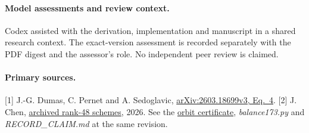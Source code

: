 \documentclass[11pt]{article}
\begin{document}
\paragraph{Model assessments and review context.}
Codex assisted with the derivation, implementation and manuscript in a shared research context. The exact-version assessment is recorded separately with the PDF digest and the assessor's role. No independent peer review is claimed.

\paragraph{Primary sources.}
[1] J.-G. Dumas, C. Pernet and A. Sedoglavic, \href{https://arxiv.org/html/2603.18699v3\#S2.E4}{arXiv:2603.18699v3, Eq.\ 4}.
[2] J. Chen, \href{https://doi.org/10.5281/zenodo.24404331}{archived rank-48 schemes}, 2026. See the \href{https://github.com/jeffchen006/tensor-rank-4x4/blob/822b2281116ae29b0ca3b947dfa4544b69258c0e/agents/hmz20-B2/ORBIT_CERTIFICATE.md}{orbit certificate}, \emph{balance173.py} and \emph{RECORD\_CLAIM.md} at the same revision.
\end{document}
